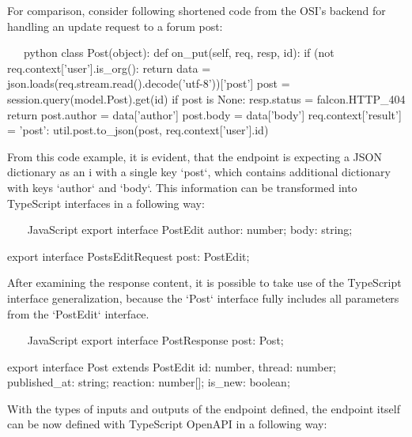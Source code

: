 \documentclass[
  digital, %
  oneside, %
  lof,     %
  lot,     %
]{fithesis4}
\begin{document}
For comparison, consider following shortened code from the OSI's backend for handling an update request to a forum post:

\newpage
~~~python
class Post(object):
    def on_put(self, req, resp, id):
        if (not req.context['user'].is_org():
            return
        data = json.loads(req.stream.read().decode('utf-8'))['post']
        post = session.query(model.Post).get(id)
        if post is None:
            resp.status = falcon.HTTP_404
            return
        post.author = data['author']
        post.body = data['body']
        req.context['result'] = {'post': util.post.to_json(post, req.context['user'].id)}
~~~


From this code example, it is evident, that the endpoint is expecting a JSON dictionary as an i with a single key `post`, which contains additional dictionary with keys `author` and `body`. This information can be transformed into TypeScript interfaces in a following way:


~~~ JavaScript
export interface PostEdit {
    author: number;
    body: string;
}

export interface PostsEditRequest {
    post: PostEdit;
}
~~~

After examining the response content, it is possible to take use of the TypeScript interface generalization, because the `Post` interface fully includes all parameters from the `PostEdit` interface.

~~~ JavaScript
export interface PostResponse {
    post: Post;
}

export interface Post extends PostEdit {
    id: number,
    thread: number;
    published_at: string;
    reaction: number[];
    is_new: boolean;
}
~~~

With the types of inputs and outputs of the endpoint defined, the endpoint itself can be now defined with TypeScript OpenAPI in a following way:
\end{document}
